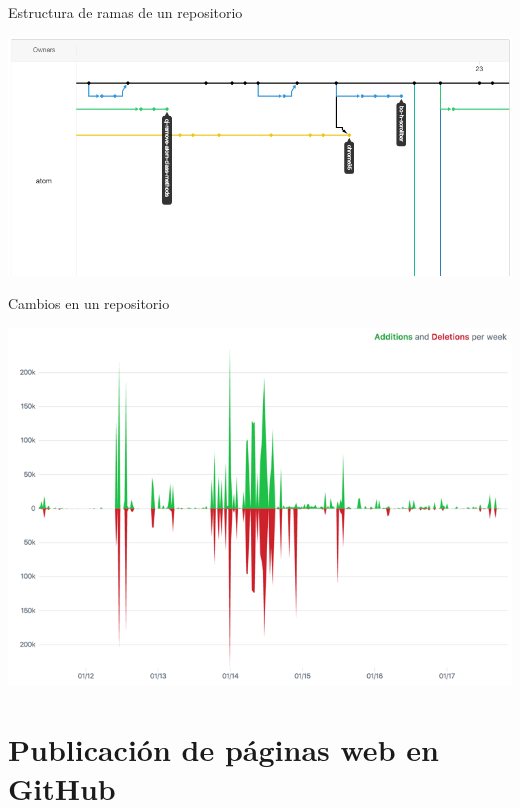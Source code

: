 \documentclass[xcolor={usenames,svgnames,dvipsnames}]{beamer}
\begin{document}
\begin{frame}[label={sec:org2a41b7e}]{Estructura de ramas de un repositorio}
\begin{center}
\includegraphics[width=.9\linewidth]{figs/repo_network_graph.png}
\end{center}
\end{frame}

\begin{frame}[label={sec:orgcca1504}]{Cambios en un repositorio}
\begin{center}
\includegraphics[width=.9\linewidth]{figs/repo_code_frequency_graph_dotcom.png}
\end{center}
\end{frame}

\section{Publicación de páginas web en GitHub}
\label{sec:org6a07271}
\end{document}
